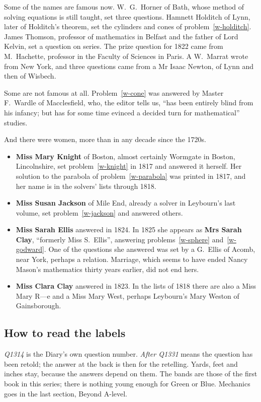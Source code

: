\documentclass[11pt,a4paper]{article}
\newcounter{prob}
\begin{document}
Some of the names are famous now. W.~G.~Horner of Bath, whose method of solving equations
is still taught, set three questions. Hamnett Holditch of Lynn, later of Holditch's
theorem, set the cylinders and cones of problem~\ref{w-holditch}. James Thomson,
professor of mathematics in Belfast and the father of Lord Kelvin, set a question on
series. The prize question for 1822 came from M.~Hachette, professor in the Faculty of
Sciences in Paris. A W.~Marrat wrote from New York, and three questions came from a Mr Isaac
Newton, of Lynn and then of Wisbech.

Some are not famous at all. Problem~\ref{w-cone} was answered by Master F.~Wardle of
Macclesfield, who, the editor tells us, ``has been entirely blind from his infancy; but
has for some time evinced a decided turn for mathematical'' studies.

And there were women, more than in any decade since the 1720s.
\begin{itemize}[leftmargin=*,itemsep=1pt]
\item \textbf{Miss Mary Knight} of Boston, almost certainly Wormgate in Boston,
Lincolnshire, set problem~\ref{w-knight} in 1817 and answered it herself. Her solution
to the parabola of problem~\ref{w-parabola} was printed in 1817, and her name is in the
solvers' lists through 1818.
\item \textbf{Miss Susan Jackson} of Mile End, already a solver in Leybourn's last volume,
set problem~\ref{w-jackson} and answered others.
\item \textbf{Miss Sarah Ellis} answered in 1824. In 1825 she appears as \textbf{Mrs Sarah
Clay}, ``formerly Miss S.~Ellis'', answering problems~\ref{w-sphere} and~\ref{w-godward}.
One of the questions she answered was set by a G.~Ellis of Acomb, near York, perhaps a
relation. Marriage, which seems to have ended Nancy Mason's mathematics thirty years
earlier, did not end hers.
\item \textbf{Miss Clara Clay} answered in 1823. In the lists of 1818 there are also a
Miss Mary R---e and a Miss Mary West, perhaps Leybourn's Mary Weston of Gainsborough.
\end{itemize}

\subsection*{How to read the labels}

\textit{Q1314} is the Diary's own question number. \textit{After Q1331} means the question
has been retold; the answer at the back is then for the retelling. Yards, feet and inches
stay, because the answers depend on them. The bands are those of the first book in this
series; there is nothing young enough for Green or Blue. Mechanics goes in the last
section, Beyond A-level.
\end{document}
